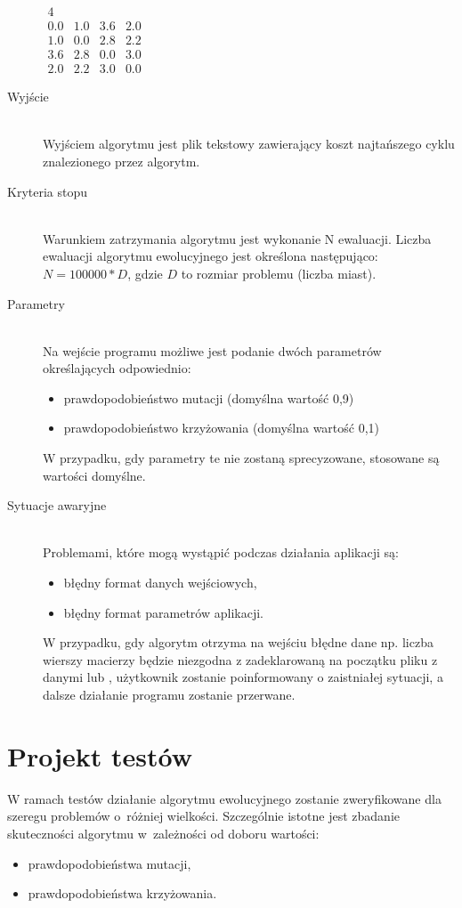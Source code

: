\documentclass[12pt, a4paper]{article}
\begin{document}
\begin{description}
\bigskip
$ 
\begin{array}{cccc}
4 \\
0.0 & 1.0 & 3.6 & 2.0 \\
1.0 & 0.0 & 2.8 & 2.2 \\
3.6 & 2.8 & 0.0 & 3.0 \\
2.0 & 2.2 & 3.0 & 0.0
\end{array}
$
	\item[Wyjście] \hfill \\
	Wyjściem algorytmu jest plik tekstowy zawierający koszt najtańszego cyklu znalezionego przez algorytm.
	\item[Kryteria stopu] \hfill \\
	Warunkiem zatrzymania algorytmu jest wykonanie N ewaluacji. Liczba ewaluacji algorytmu ewolucyjnego jest określona następująco: $N = 100000 * D$, gdzie $D$ to rozmiar problemu (liczba miast).
	\item[Parametry] \hfill \\
	Na wejście programu możliwe jest podanie dwóch parametrów określających odpowiednio:
		\begin{itemize}
			\item prawdopodobieństwo mutacji (domyślna wartość 0,9)
			\item prawdopodobieństwo krzyżowania (domyślna wartość 0,1)
		\end{itemize}
		W przypadku, gdy parametry te nie zostaną sprecyzowane, stosowane są wartości domyślne.
	\item[Sytuacje awaryjne] \hfill \\
Problemami, które mogą wystąpić podczas działania aplikacji są:
	\begin{itemize}
        \item błędny format danych wejściowych,
        \item błędny format parametrów aplikacji.
	\end{itemize}
\bigskip
W przypadku, gdy algorytm otrzyma na wejściu błędne dane np. liczba wierszy macierzy będzie niezgodna z zadeklarowaną na początku pliku z danymi lub , użytkownik zostanie poinformowany o zaistniałej sytuacji, a dalsze działanie programu zostanie przerwane.

\end{description}

\section{Projekt testów}
W ramach testów działanie algorytmu ewolucyjnego zostanie zweryfikowane dla szeregu problemów o~różniej wielkości. Szczególnie istotne jest zbadanie skuteczności algorytmu w~zależności od doboru wartości:
\begin{itemize}
	\item prawdopodobieństwa mutacji,
	\item prawdopodobieństwa krzyżowania.
\end{itemize}
\end{document}
